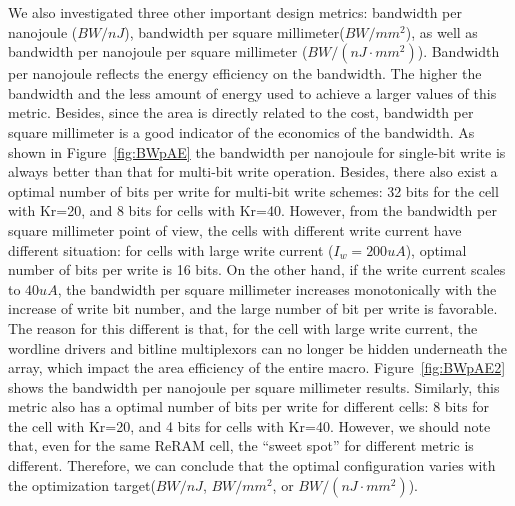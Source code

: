 We also investigated three other important design metrics: bandwidth per
nanojoule ($BW/nJ$), bandwidth per square millimeter($BW/mm^2$), as well
as bandwidth per nanojoule per square millimeter ($BW/(nJ\cdot mm^2)$).
Bandwidth per nanojoule reflects the energy efficiency on the bandwidth.
The higher the bandwidth and the less amount of energy used to achieve a
larger values of this metric. Besides, since the area is directly related
to the cost, bandwidth per square millimeter is a good indicator of the
economics of the bandwidth. As shown in Figure~\ref{fig:BWpAE} the
bandwidth per nanojoule for single-bit write is always better than that
for multi-bit write operation. Besides, there also exist a optimal number
of bits per write for multi-bit write schemes: 32 bits for the cell with
Kr=20, and 8 bits for cells with Kr=40. However, from the bandwidth per
square millimeter point of view, the cells with different write current
have different situation: for cells with large write current
($I_w=200uA$), optimal number of bits per write is 16 bits. On the other
hand, if the write current scales to $40uA$, the bandwidth per square
millimeter increases monotonically with the increase of write bit number,
and the large number of bit per write is favorable. The reason for this
different is that, for the cell with large write current, the wordline
drivers and bitline multiplexors can no longer be hidden underneath the
array, which impact the area efficiency of the entire macro.
Figure~\ref{fig:BWpAE2} shows the bandwidth per nanojoule per square
millimeter results. Similarly, this metric also has a optimal number of
bits per write for different cells: 8 bits for the cell with Kr=20, and 4
bits for cells with Kr=40. However, we should note that, even for the same
ReRAM cell, the ``sweet spot'' for different metric is different.
Therefore, we can conclude that the optimal configuration varies with the
optimization target($BW/nJ$, $BW/mm^2$, or $BW/(nJ\cdot mm^2)$).





